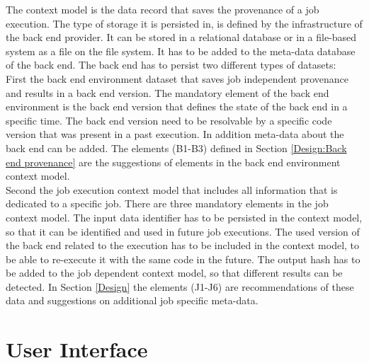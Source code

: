 \documentclass[draft,final]{vutinfth} %
\begin{document}
The context model is the data record that saves the provenance of a job execution. The type of storage it is persisted in,  is defined by the infrastructure of the back end provider. It can be stored in a relational database or in a file-based system as a file on the file system. It has to be added to the meta-data database of the back end. The back end has to persist two different types of datasets: \\
First the back end environment dataset that saves job independent provenance and results in a back end version. The mandatory element of the back end environment is the back end version that defines the state of the back end in a specific time. The back end version need to be resolvable by a specific code version that was present in a past execution. In addition meta-data about the back end can be added. The elements (B1-B3) defined in Section \ref{Design:Back end provenance} are the suggestions of elements in the back end environment context model.\\
Second the job execution context model that includes all information that is dedicated to a specific job. There are three mandatory elements in the job context model. The input data identifier has to be persisted in the context model, so that it can be identified and used in future job executions. The used version of the back end related to the execution has to be included in the context model, to be able to re-execute it with the same code in the future. The output hash has to be added to the job dependent context model, so that different results can be detected. In Section \ref{Design} the elements (J1-J6) are recommendations of these data and suggestions on additional job specific meta-data.  



\section{User Interface}\label{Design:User Interface}
\end{document}
